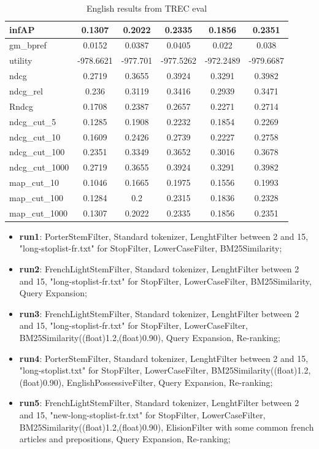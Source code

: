 \begin{table}[h!]
\begin{tabular}{ |l|c|c|c|c|c| }
        infAP & 0.1307 & 0.2022 & 0.2335 & 0.1856 & 0.2351 \\ \hline
        gm\_bpref & 0.0152 & 0.0387 & 0.0405 & 0.022 & 0.038 \\ \hline
        utility & -978.6621 & -977.701 & -977.5262 & -972.2489 & -979.6687 \\ \hline
        ndcg & 0.2719 & 0.3655 & 0.3924 & 0.3291 & 0.3982 \\ \hline
        ndcg\_rel & 0.236 & 0.3119 & 0.3416 & 0.2939 & 0.3471 \\ \hline
        Rndcg & 0.1708 & 0.2387 & 0.2657 & 0.2271 & 0.2714 \\ \hline
        ndcg\_cut\_5 & 0.1285 & 0.1908 & 0.2232 & 0.1854 & 0.2269 \\ \hline
        ndcg\_cut\_10 & 0.1609 & 0.2426 & 0.2739 & 0.2227 & 0.2758 \\ \hline
        ndcg\_cut\_100 & 0.2351 & 0.3349 & 0.3652 & 0.3016 & 0.3678 \\ \hline
        ndcg\_cut\_1000 & 0.2719 & 0.3655 & 0.3924 & 0.3291 & 0.3982 \\ \hline
        map\_cut\_10 & 0.1046 & 0.1665 & 0.1975 & 0.1556 & 0.1993 \\ \hline
        map\_cut\_100 & 0.1284 & 0.2 & 0.2315 & 0.1836 & 0.2328 \\ \hline
        map\_cut\_1000 & 0.1307 & 0.2022 & 0.2335 & 0.1856 & 0.2351 \\ \hline
        
    \end{tabular}
    \caption{English results from TREC eval}
    \label{table:results}
\end{table}
\pagebreak
\begin{itemize}
    \item \textbf{run1}: PorterStemFilter, Standard tokenizer, LenghtFilter between 2 and 15, "long-stoplist-fr.txt" for StopFilter, LowerCaseFilter, BM25Similarity;
    \item \textbf{run2}: FrenchLightStemFilter, Standard tokenizer, LenghtFilter between 2 and 15, "long-stoplist-fr.txt" for StopFilter, LowerCaseFilter, BM25Similarity, Query Expansion;
    \item \textbf{run3}: FrenchLightStemFilter, Standard tokenizer, LenghtFilter between 2 and 15, "long-stoplist-fr.txt" for StopFilter, LowerCaseFilter,\\ BM25Similarity((float)1.2,(float)0.90), Query Expansion, Re-ranking;
    \item \textbf{run4}: PorterStemFilter, Standard tokenizer, LenghtFilter between 2 and 15, "long-stoplist.txt" for StopFilter, LowerCaseFilter, BM25Similarity((float)1.2,(float)0.90), EnglishPossessiveFilter, Query Expansion, Re-ranking;
    \item \textbf{run5}: FrenchLightStemFilter, Standard tokenizer, LenghtFilter between 2 and 15, "new-long-stoplist-fr.txt" for StopFilter, LowerCaseFilter,\\ BM25Similarity((float)1.2,(float)0.90), ElisionFilter with some common french articles and prepositions, Query Expansion, Re-ranking;
\end{itemize}


